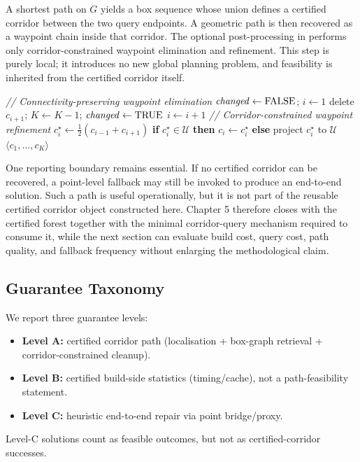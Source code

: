 \documentclass[journal]{IEEEtran}
\DeclareRobustCommand{\textsc}[1]{\textnormal{\MakeUppercase{#1}}}
\begin{document}
A shortest path on $G$ yields a box sequence whose union defines a certified
corridor between the two query endpoints. A geometric path is then recovered as
a waypoint chain inside that corridor. The optional post-processing in
 performs only corridor-constrained waypoint
elimination and refinement. This step is purely local; it introduces no new
global planning problem, and feasibility is inherited from the certified
corridor itself.

\begin{algorithm}[t]
\caption{Lightweight corridor cleanup (\textsc{PathOpt})}
\label{alg:pathopt_rewrite}
\footnotesize
\begin{algorithmic}[1]
\STATE \textit{// Connectivity-preserving waypoint elimination}
\REPEAT
  \STATE $\mathit{changed} \gets \textsc{false}$; $i \gets 1$
      \STATE delete $c_{i+1}$; $K \gets K-1$; $\mathit{changed} \gets \textsc{true}$
    \ELSE
      \STATE $i \gets i+1$
    \ENDIF
  \ENDWHILE
{}
\STATE \textit{// Corridor-constrained waypoint refinement}
  \STATE $c_i^\star \gets \tfrac{1}{2}(c_{i-1}+c_{i+1})$
  \STATE \textbf{if} $c_i^\star \in \mathcal{U}$ \textbf{then} $c_i \gets c_i^\star$
  \STATE \textbf{else} project $c_i^\star$ to $\mathcal{U}$
\ENDFOR
\STATE \RETURN $\langle c_1,\dots,c_K\rangle$
\end{algorithmic}
\end{algorithm}

One reporting boundary remains essential. If no certified corridor can be
recovered, a point-level fallback may still be invoked to produce an end-to-end
solution. Such a path is useful operationally, but it is not part of the
reusable certified corridor object constructed here. Chapter 5 therefore closes
with the certified forest together with the minimal corridor-query mechanism
required to consume it, while the next section can evaluate build cost, query
cost, path quality, and fallback frequency without enlarging the
methodological claim.

\subsection{Guarantee Taxonomy}
\label{sec:guarantee_taxonomy}

We report three guarantee levels:
\begin{itemize}[nosep]
  \item \textbf{Level A:} certified corridor path (localisation + box-graph
  retrieval + corridor-constrained cleanup).
  \item \textbf{Level B:} certified build-side statistics (timing/cache), not a
  path-feasibility statement.
  \item \textbf{Level C:} heuristic end-to-end repair via point bridge/proxy.
\end{itemize}
Level-C solutions count as feasible outcomes, but not as certified-corridor
successes.
\end{document}
